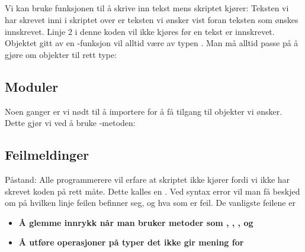 \subsection{}
Vi kan bruke funksjonen  til å skrive inn tekst mens skriptet kjører:
Teksten vi har skrevet inni  i skriptet over er teksten vi ønsker vist foran teksten som ønskes innskrevet. Linje 2 i denne koden vil ikke kjøres før en tekst er innskrevet.
\newpage
Objektet gitt av en -funksjon vil alltid være av typen . Man må alltid passe på å gjøre om objekter til rett type:
\subsection{Moduler}
Noen ganger er vi nødt til å importere  for å få tilgang til objekter vi ønsker. Dette gjør vi ved å bruke -metoden:

\newpage
\subsection{Feilmeldinger}
Påstand: Alle programmerere vil erfare at skriptet ikke kjører fordi vi ikke har skrevet koden på rett måte. Dette kalles en . Ved syntax error vil man få beskjed om på hvilken linje feilen befinner seg, og hva som er feil. De vanligste feilene er
\begin{itemize}
\item \textbf{Å glemme innrykk når man bruker metoder som , , , og  }
\item \textbf{Å utføre operasjoner på typer det ikke gir mening for}
\end{itemize}

\newpage



